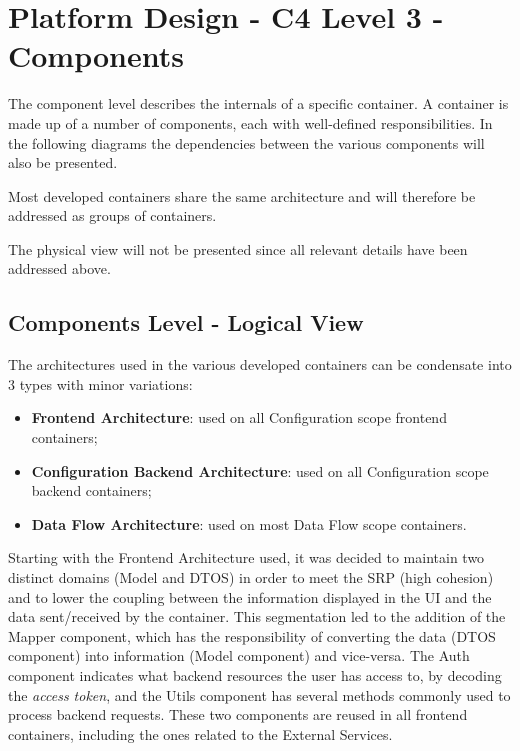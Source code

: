 
\chapter{Platform Design - C4 Level 3 - Components}
\label{appendix:design:architecture:platform:components}

The component level describes the internals of a specific container. A container is made up of a number of components, each with well-defined responsibilities. In the following diagrams the dependencies between the various components will also be presented.

Most developed containers share the same architecture and will therefore be addressed as groups of containers.

The physical view will not be presented since all relevant details have been addressed above.

\section{Components Level - Logical View}
\label{par:design:architecture:platform:components:logical}

The architectures used in the various developed containers can be condensate into 3 types with minor variations:

\begin{itemize}
   \item \textbf{Frontend Architecture}: used on all Configuration scope frontend containers;
   \item \textbf{Configuration Backend Architecture}: used on all Configuration scope backend containers;
   \item \textbf{Data Flow Architecture}: used on most Data Flow scope containers.
\end{itemize}

Starting with the Frontend Architecture used, it was decided to maintain two distinct domains (Model and DTOS) in order to meet the \gls{SRP} (high cohesion) and to lower the coupling between the information displayed in the UI and the data sent/received by the container. This segmentation led to the addition of the Mapper component, which has the responsibility of converting the data (DTOS component) into information (Model component) and vice-versa. The Auth component indicates what backend resources the user has access to, by decoding the \textit{access token}, and the Utils component has several methods commonly used to process backend requests. These two components are reused in all frontend containers, including the ones related to the External Services.

